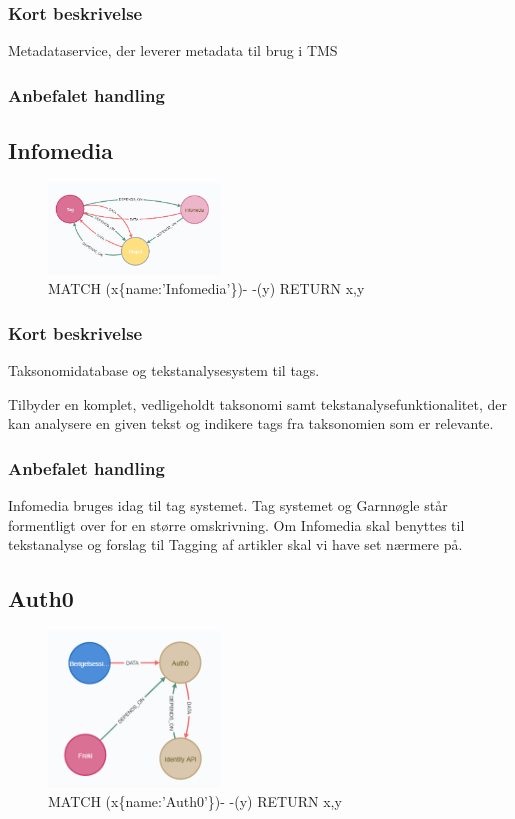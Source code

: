 \documentclass{article}
\begin{document}
\subsubsection*{Kort beskrivelse}
Metadataservice, der leverer metadata til brug i TMS
\subsubsection*{Anbefalet handling}



\subsection{Infomedia}
\begin{figure}[h]
\includegraphics[width=130pt]{Infomedia.PNG}
\caption{MATCH (x\{name:'Infomedia'\})- -(y) RETURN x,y}
\end{figure}
\subsubsection*{Kort beskrivelse}
Taksonomidatabase og tekstanalysesystem til tags.

Tilbyder en komplet, vedligeholdt taksonomi samt tekstanalysefunktionalitet, der kan analysere en given tekst og indikere tags fra taksonomien som er relevante.

\subsubsection*{Anbefalet handling}
Infomedia bruges idag til tag systemet. Tag systemet og Garnnøgle står formentligt over for en større omskrivning. Om Infomedia skal benyttes til tekstanalyse og forslag til Tagging af artikler skal vi have set nærmere på.



\subsection{Auth0}
\begin{figure}[h]
\includegraphics[width=130pt]{Auth0.PNG}
\caption{MATCH (x\{name:'Auth0'\})- -(y) RETURN x,y}
\end{figure}
\end{document}
